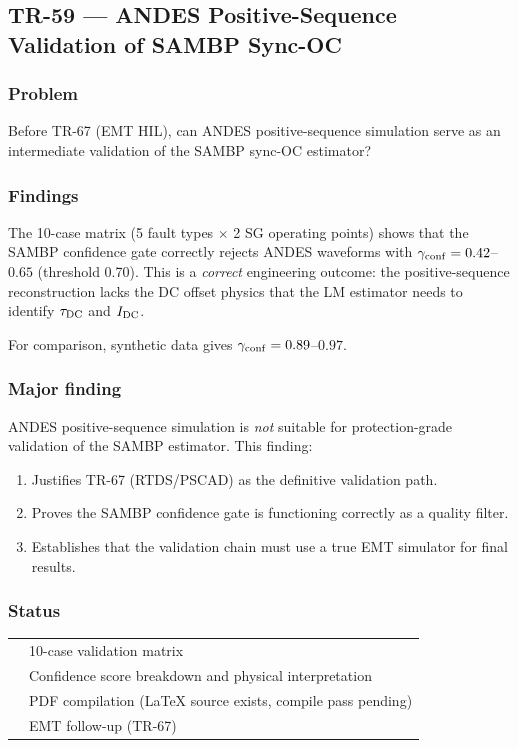 \documentclass[12pt,a4paper]{article}
\newcommand{\cmark}{\ding{51}}
\newcommand{\pmark}{\ding{118}}   %
\begin{document}
\bigskip

\subsection{TR-59 — ANDES Positive-Sequence Validation of SAMBP Sync-OC}
\label{sec:tr59}

\subsubsection{Problem}
Before TR-67 (EMT HIL), can ANDES positive-sequence simulation serve as
an intermediate validation of the SAMBP sync-OC estimator?

\subsubsection{Findings}
The 10-case matrix (5 fault types $\times$ 2 SG operating points) shows that
the SAMBP confidence gate correctly rejects ANDES waveforms with
$\gamma_{\rm conf} = 0.42$--$0.65$ (threshold 0.70).  This is a
\emph{correct} engineering outcome: the positive-sequence reconstruction
lacks the DC offset physics that the LM estimator needs to identify
$\tau_{\rm DC}$ and $I_{\rm DC}$.

For comparison, synthetic data gives $\gamma_{\rm conf} = 0.89$--$0.97$.

\subsubsection{Major finding}
ANDES positive-sequence simulation is \emph{not} suitable for protection-grade
validation of the SAMBP estimator.  This finding:
\begin{enumerate}
  \item Justifies TR-67 (RTDS/PSCAD) as the definitive validation path.
  \item Proves the SAMBP confidence gate is functioning correctly as a quality filter.
  \item Establishes that the validation chain must use a true EMT simulator
    for final results.
\end{enumerate}

\subsubsection{Status}
\begin{tabular}{ll}
  \cmark & 10-case validation matrix \\
  \cmark & Confidence score breakdown and physical interpretation \\
  \pmark & PDF compilation (LaTeX source exists, compile pass pending) \\
  \pmark & EMT follow-up (TR-67) \\
\end{tabular}
\end{document}
